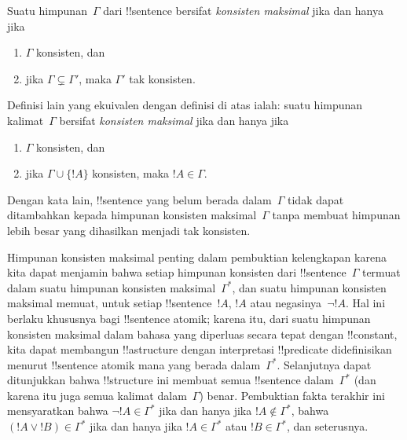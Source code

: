 \documentclass[../../../include/open-logic-section]{subfiles}
\begin{document}

\begin{defn}
Suatu himpunan~$\Gamma$ dari !!{sentence} bersifat \emph{konsisten maksimal}
jika dan hanya jika
\begin{enumerate}
\item $\Gamma$ konsisten, dan
\item jika $\Gamma \subsetneq \Gamma'$, maka $\Gamma'$ tak konsisten.
\end{enumerate}
\end{defn}

\begin{explain}
Definisi lain yang ekuivalen dengan definisi di atas ialah: suatu himpunan
kalimat~$\Gamma$ bersifat \emph{konsisten maksimal} jika dan hanya jika
\begin{enumerate}
\item $\Gamma$ konsisten, dan
\item jika $\Gamma \cup \{ !A \}$ konsisten, maka $!A \in \Gamma$.
\end{enumerate}
Dengan kata lain, !!{sentence} yang belum berada dalam~$\Gamma$ tidak dapat
ditambahkan kepada himpunan konsisten maksimal~$\Gamma$ tanpa membuat
himpunan lebih besar yang dihasilkan menjadi tak konsisten.
\end{explain}

\begin{explain}
Himpunan konsisten maksimal penting dalam pembuktian kelengkapan karena kita
dapat menjamin bahwa setiap himpunan konsisten dari !!{sentence}~$\Gamma$
termuat dalam suatu himpunan konsisten maksimal~$\Gamma^*$, dan suatu himpunan
konsisten maksimal memuat, untuk setiap !!{sentence}~$!A$, $!A$ atau
negasinya~$\lnot !A$. Hal ini berlaku khususnya bagi !!{sentence} atomik;
karena itu, dari suatu himpunan konsisten maksimal dalam bahasa yang diperluas
secara tepat dengan !!{constant}, kita dapat membangun !!a{structure} dengan
interpretasi !!{predicate} didefinisikan menurut !!{sentence} atomik mana
yang berada dalam~$\Gamma^*$. Selanjutnya dapat ditunjukkan bahwa
!!{structure} ini membuat semua !!{sentence} dalam~$\Gamma^*$ (dan karena itu
juga semua kalimat dalam~$\Gamma$) benar. Pembuktian fakta terakhir ini
mensyaratkan bahwa $\lnot !A \in \Gamma^*$ jika dan hanya jika
$!A \notin \Gamma^*$, bahwa $(!A \lor !B) \in \Gamma^*$ jika dan hanya
jika $!A \in \Gamma^*$ atau $!B \in \Gamma^*$, dan seterusnya.
\end{explain}
\end{document}
